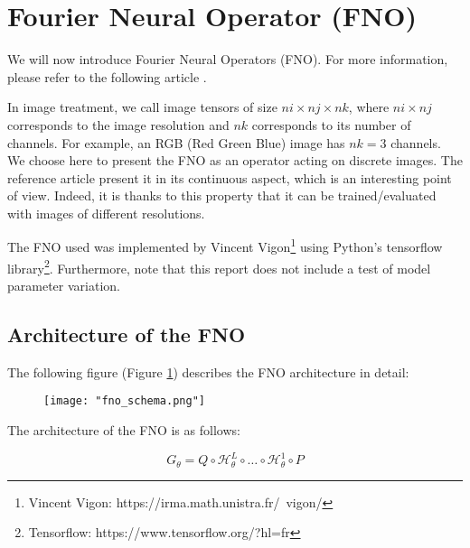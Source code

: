 \section{Fourier Neural Operator (FNO)} \label{FNO}
\graphicspath{{images/fourier}}

We will now introduce Fourier Neural Operators (FNO). For more information, please refer to the following article \cite{li_fourier_2021,li_fourier_2022,li_neural_2020,li_physics-informed_2023}.

In image treatment, we call image tensors of size $ni\times nj\times nk$, where $ni\times nj$ corresponds to the image resolution and $nk$ corresponds to its number of channels. For example, an RGB (Red Green Blue) image has $nk=3$ channels. 
We choose here to present the FNO as an operator acting on discrete images. The reference article \cite{li_fourier_2021} present it in its continuous aspect, which is an interesting point of view. Indeed, it is thanks to this property that it can be trained/evaluated with images of different resolutions.

\begin{Rem}
	The FNO used was implemented by Vincent Vigon\footnote{Vincent Vigon: https://irma.math.unistra.fr/~vigon/} using Python's tensorflow library\footnote{Tensorflow: https://www.tensorflow.org/?hl=fr}.
	Furthermore, note that this report does not include a test of model parameter variation.
\end{Rem}

\subsection{Architecture of the FNO}

The following figure (Figure \ref{FNO_schema}) describes the FNO architecture in detail:

\begin{figure}[H]
	\texttt{[image: "fno\_schema.png"]}
	\label{FNO_schema}
\end{figure}

The architecture of the FNO is as follows:

\begin{equation*}
	G_\theta = Q \circ \mathcal{H}_\theta^L \circ \dots \circ \mathcal{H}_\theta^1 \circ P
\end{equation*}

\newpage


